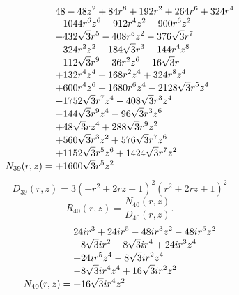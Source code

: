 \documentclass[11pt,a4paper]{article}
\begin{document}
\begin{equation}
N_{39}(r,z)=\shortstack[l]{$\displaystyle 48 - 48 z^{2} + 84 r^{8} + 192 r^{2} + 264 r^{6} + 324 r^{4}$\\
$\displaystyle  - 1044 r^{6} z^{6} - 912 r^{4} z^{2} - 900 r^{6} z^{2}$\\
$\displaystyle  - 432 \sqrt{3} r^{5} - 408 r^{8} z^{2} - 376 \sqrt{3} r^{7}$\\
$\displaystyle  - 324 r^{2} z^{2} - 184 \sqrt{3} r^{3} - 144 r^{4} z^{8}$\\
$\displaystyle  - 112 \sqrt{3} r^{9} - 36 r^{2} z^{6} - 16 \sqrt{3} r$\\
$\displaystyle  + 132 r^{4} z^{4} + 168 r^{2} z^{4} + 324 r^{8} z^{4}$\\
$\displaystyle  + 600 r^{4} z^{6} + 1680 r^{6} z^{4} - 2128 \sqrt{3} r^{5} z^{4}$\\
$\displaystyle  - 1752 \sqrt{3} r^{7} z^{4} - 408 \sqrt{3} r^{3} z^{4}$\\
$\displaystyle  - 144 \sqrt{3} r^{9} z^{4} - 96 \sqrt{3} r^{3} z^{6}$\\
$\displaystyle  + 48 \sqrt{3} r z^{4} + 288 \sqrt{3} r^{9} z^{2}$\\
$\displaystyle  + 560 \sqrt{3} r^{3} z^{2} + 576 \sqrt{3} r^{7} z^{6}$\\
$\displaystyle  + 1152 \sqrt{3} r^{5} z^{6} + 1424 \sqrt{3} r^{7} z^{2}$\\
$\displaystyle  + 1600 \sqrt{3} r^{5} z^{2}$}
\label{eq:cat-numerator-39}
\end{equation}
\begin{equation}
D_{39}(r,z)=3 \left(- r^{2} + 2 r z - 1\right)^{2} \left(r^{2} + 2 r z + 1\right)^{2}
\label{eq:cat-denominator-39}
\end{equation}
\begin{equation}
R_{40}(r,z)=\frac{N_{40}(r,z)}{D_{40}(r,z)}.
\label{eq:cat-rational-40}
\end{equation}
\begin{equation}
N_{40}(r,z)=\shortstack[l]{$\displaystyle 24 i r^{3} + 24 i r^{5} - 48 i r^{3} z^{2} - 48 i r^{5} z^{2}$\\
$\displaystyle  - 8 \sqrt{3} i r^{2} - 8 \sqrt{3} i r^{4} + 24 i r^{3} z^{4}$\\
$\displaystyle  + 24 i r^{5} z^{4} - 8 \sqrt{3} i r^{2} z^{4}$\\
$\displaystyle  - 8 \sqrt{3} i r^{4} z^{4} + 16 \sqrt{3} i r^{2} z^{2}$\\
$\displaystyle  + 16 \sqrt{3} i r^{4} z^{2}$}
\label{eq:cat-numerator-40}
\end{equation}
\end{document}

